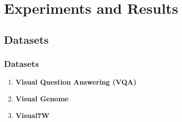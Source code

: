 \documentclass{beamer}
\begin{document}
\section{Experiments and Results} 
\subsection{Datasets}
\begin{frame}
\frametitle{Datasets}
\begin{enumerate} 
  \item \textbf{Visual Question Answering (VQA)}
  \item \textbf{Visual Genome}
  \item \textbf{Visual7W}
  \end{enumerate}  
\end{frame}
\end{document}
